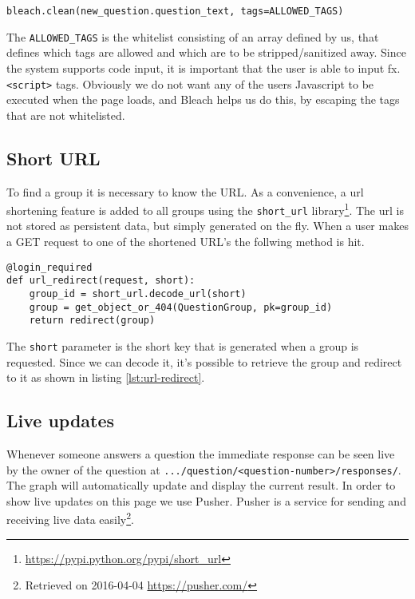 \begin{lstlisting}[caption=Using Bleach to sanitize input, label=lst:bleach]
bleach.clean(new_question.question_text, tags=ALLOWED_TAGS)
\end{lstlisting}

The \texttt{ALLOWED\_TAGS} is the whitelist consisting of an array defined by us, that defines which tags are allowed and which are to be stripped/sanitized away. Since the system supports code input, it is important that the user is able to input fx. \texttt{<script>} tags. Obviously we do not want any of the users Javascript to be executed when the page loads, and Bleach helps us do this, by escaping the tags that are not whitelisted. 

\subsection*{Short URL}
To find a group it is necessary to know the URL. As a convenience, a url shortening feature is added to all groups using the \texttt{short\_url} library\footnote{\url{https://pypi.python.org/pypi/short_url}}. The url is not stored as persistent data, but simply generated on the fly. When a user makes a GET request to one of the shortened URL's the follwing method is hit.

\begin{lstlisting}[caption=The URL redirect method, label=lst:url-redirect]
@login_required
def url_redirect(request, short):
    group_id = short_url.decode_url(short)
    group = get_object_or_404(QuestionGroup, pk=group_id)
    return redirect(group)
\end{lstlisting}

The \texttt{short} parameter is the short key that is generated when a group is requested. Since we can decode it, it's possible to retrieve the group and redirect to it as shown in listing \ref{lst:url-redirect}.

\subsection*{Live updates}
Whenever someone answers a question the immediate response can be seen live by the owner of the question at \texttt{.../question/<question-number>/responses/}. The graph will automatically update and display the current result. In order to show live updates on this page we use Pusher. Pusher is a service for sending and receiving live data easily\footnote{Retrieved on 2016-04-04 \url{https://pusher.com/}}.

